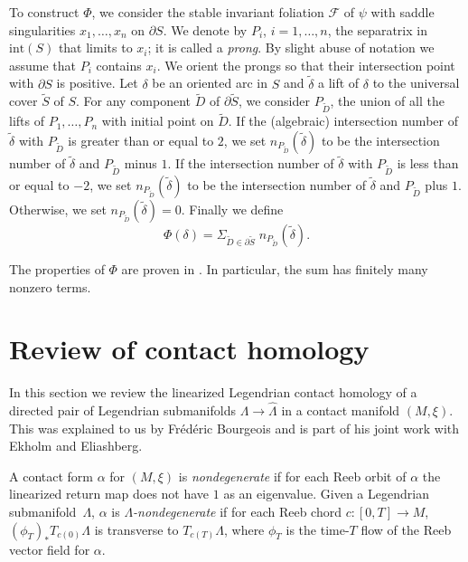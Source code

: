 \documentclass[10pt]{amsart}
\let\mathcal\mathscr
\let\ra\rightarrow
\newcommand{\inte}{\mathrm{int}}
\theoremstyle{plain}
\theoremstyle{definition}
\numberwithin{equation}{subsection}
\newcommand{\cF}{\mathcal{F}}
\begin{document}
To construct $\Phi$, we consider the stable invariant foliation $\cF$ of $\psi$ with saddle singularities $x_1,\dots,x_n$ on $\partial S$. We denote by $P_i$, $i=1,\dots, n$, the separatrix in $\inte(S)$ that limits to $x_i$; it is called a {\em prong}. By slight abuse of notation we assume that $P_i$ contains $x_i$. We orient the prongs so that their intersection point with $\partial S$ is positive. Let $\delta$ be an oriented arc in $S$ and $\widetilde{\delta}$ a lift of $\delta$ to the universal cover $\widetilde{S}$ of $S$. For any component $\widetilde{D}$ of $\partial \widetilde{S}$, we consider $P_{\widetilde{D}}$, the union of all the lifts of $P_1,\dots,P_n$ with initial point on $\widetilde{D}$. If the (algebraic) intersection number of $\widetilde{\delta}$ with $P_{\widetilde{D}}$ is greater than or equal to $2$, we set $n_{P_{\widetilde{D}}} (\widetilde{\delta})$ to be the intersection number of $\widetilde{\delta}$ and $P_{\widetilde{D}}$ minus $1$. If the intersection number of $\widetilde{\delta}$ with $P_{\widetilde{D}}$ is less than or equal to $-2$, we set $n_{P_{\widetilde{D}}} (\widetilde{\delta})$ to be the intersection number of $\widetilde{\delta}$ and $P_{\widetilde{D}}$ plus $1$. Otherwise, we set $n_{P_{\widetilde{D}}} (\widetilde{\delta})=0$. Finally we define
\begin{equation} \label{eqn: defn of phi}
\Phi (\delta)=\Sigma_{\widetilde{D} \in \partial \widetilde{S}}\; n_{P_{\widetilde{D}}} (\widetilde{\delta}).
\end{equation}

The properties of $\Phi$ are proven in \cite{CH2}. In particular, the sum has finitely many nonzero terms.

\section{Review of contact homology} \label{section: review of contact homology}

In this section we review the linearized Legendrian contact homology of a directed pair of Legendrian submanifolds $\Lambda\ra\widehat{\Lambda}$ in a contact manifold $(M,\xi)$. This was explained to us by Frédéric Bourgeois and is part of his joint work \cite{BEE} with Ekholm and Eliashberg.

A contact form $\alpha$ for $(M,\xi)$ is {\em nondegenerate} if for each Reeb orbit of $\alpha$ the linearized return map does not have $1$ as an eigenvalue. Given a Legendrian submanifold~$\Lambda$, $\alpha$ is {\em $\Lambda$-nondegenerate} if for each Reeb chord $c: [0,T]\to M$, $(\phi_T)_*T_{c(0)}\Lambda$ is transverse to $T_{c(T)}\Lambda$, where $\phi_T$ is the time-$T$ flow of the Reeb vector field for $\alpha$.
\end{document}
